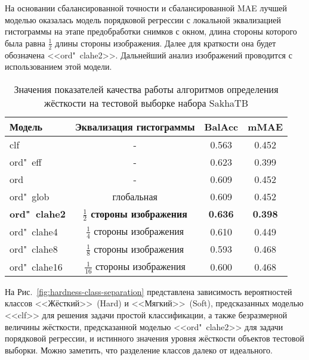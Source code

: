 На основании сбалансированной точности и сбалансированной MAE лучшей моделью оказалась модель порядковой регрессии с локальной эквализацией гистограммы на этапе предобработки снимков с окном, длина стороны которого была равна $\frac{1}{2}$ длины стороны изображения. Далее для краткости она будет обозначена <<ord"~clahe2>>. Дальнейший анализ изображений проводится с использованием этой модели.

\begin{table} [htbp]%
	\centering
	\caption{Значения показателей качества работы алгоритмов определения жёсткости на тестовой выборке набора SakhaTB}%
	\label{tab:hardness-metrics-test}%
	\renewcommand{\arraystretch}{1.5}%
	\begin{SingleSpace}
		\begin{tabular}{@{}@{\extracolsep{20pt}}lccc@{}} %
			\toprule     %
			Модель & Эквализация гистограммы & BalAcc & mMAE \\
			\midrule %
			clf	& - & 0.563 & 0.452 \\
			ord"~eff & - & 0.623 & 0.399 \\
			ord & - & 0.609 & 0.452 \\
			ord"~glob & глобальная & 0.609 & 0.452 \\
			\textbf{ord"~clahe2} & \textbf{$\frac{1}{2}$ стороны изображения} & \textbf{0.636} & \textbf{0.398} \\
			ord"~clahe4 & $\frac{1}{4}$ стороны изображения	& 0.610 & 0.449 \\
			ord"~clahe8 & $\frac{1}{8}$ стороны изображения	& 0.593 & 0.468 \\
			ord"~clahe16 & $\frac{1}{16}$ стороны изображения & 0.600 & 0.468 \\
			\bottomrule %
		\end{tabular}%
	\end{SingleSpace}
\end{table}

На Рис.~\ref{fig:hardness-class-separation} представлена зависимость вероятностей классов <<Жёсткий>>~(Hard) и <<Мягкий>>~(Soft), предсказанных моделью <<clf>> для решения задачи простой классификации, а также безразмерной величины жёсткости, предсказанной моделью <<ord"~clahe2>> для задачи порядковой регрессии, и истинного значения уровня жёсткости объектов тестовой выборки. Можно заметить, что разделение классов далеко от идеального.

